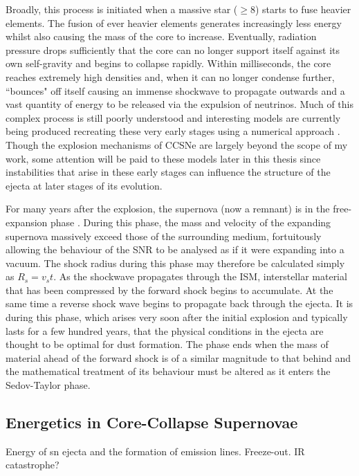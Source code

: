 Broadly, this process is initiated when a massive star ($\ge 8$\msun) starts to fuse heavier elements. The fusion of ever heavier elements generates increasingly less energy whilst also causing the mass of the core to increase.  Eventually, radiation pressure drops sufficiently that the core can no longer support itself against its own self-gravity and begins to collapse rapidly. Within milliseconds, the core reaches extremely high densities and, when it can no longer condense further, ``bounces" off itself causing  an immense shockwave to propagate outwards and a vast quantity of energy to be released via the expulsion of neutrinos.  Much of this complex process is still poorly understood and interesting models are currently being produced recreating these very early stages using a numerical approach \citep{Hammer2010,Takiwaki2014,Wongwathanarat2015}.  Though the explosion mechanisms of CCSNe are largely beyond the scope of my work, some attention will be paid to these models later in this thesis since instabilities that arise in these early stages can influence the structure of the ejecta at later stages of its evolution.

For many years after the explosion, the supernova (now a remnant) is in the free-expansion phase \citep{Landau1959,Ostriker1988}. During this phase, the mass and velocity of the expanding supernova massively exceed those of the surrounding medium, fortuitously allowing the behaviour of the SNR to be analysed as if it were expanding into a vacuum.  The shock radius during this phase may therefore be calculated simply as $R_s = v_s t$.  As the shockwave propagates through the ISM, interstellar material that has been compressed by the forward shock begins to accumulate.  At the same time a reverse shock wave begins to propagate back through the ejecta.  It is during this phase, which arises very soon after the initial explosion and typically lasts for a few hundred years, that the physical conditions in the ejecta are thought to be optimal for dust formation.  The phase ends when the mass of material ahead of the forward shock is of a similar magnitude to that behind and the mathematical treatment of its behaviour must be altered as it enters the Sedov-Taylor phase.
 
 \subsection{Energetics in Core-Collapse Supernovae}

Energy of sn ejecta and the formation of emission lines.  Freeze-out. IR catastrophe?

